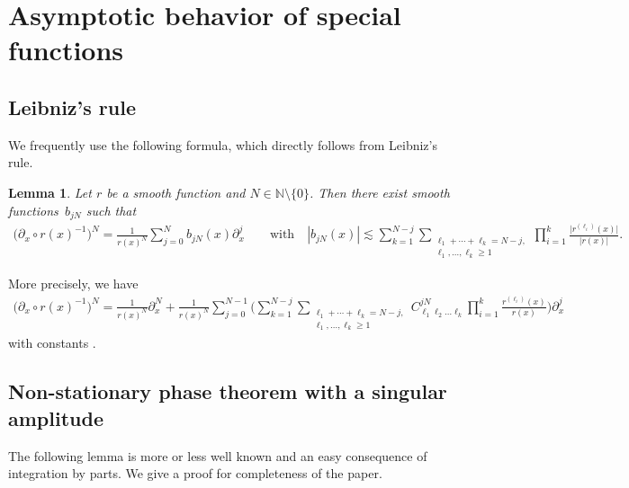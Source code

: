 \documentclass[10pt,a4paper]{amsart}
\numberwithin{equation}{section}
\newtheorem{Lemma}[Theorem]{Lemma}
\def\pa{\partial}
\begin{document}
\appendix

\section{Asymptotic behavior of special functions}

\subsection{Leibniz's rule}

We frequently use the following formula, which directly follows from Leibniz's rule.

\begin{Lemma}\label{Leibnizrule}
Let $r$ be a smooth function and $N\in\mathbb{N}\setminus\{0\}$. Then there exist smooth functions~$b_{jN}$ such that
\begin{gather*}
\bigl(\pa_x\circ r(x)^{-1}\bigr)^N=\frac{1}{r(x)^N}\!\sum_{j=0}^Nb_{jN}(x)\pa_{x}^j\qquad \text{with}\quad |b_{jN}(x)|\lesssim \sum_{k=1}^{N-j}\sum_{\substack{\ell_1+\cdots+\ell_k=N-j,\\ \ell_1,\hdots,\ell_k\geq 1}}\prod_{i=1}^k\!\frac{\big|r^{(\ell_i)}(x)\big|}{|r(x)|}.
\end{gather*}
\end{Lemma}

\begin{Remark}
More precisely, we have
\begin{align*}
\bigl(\pa_x\circ r(x)^{-1}\bigr)^N=\frac{1}{r(x)^N}\pa_x^N+\frac{1}{r(x)^N}\sum_{j=0}^{N-1}\Bigg(\sum_{k=1}^{N-j}\sum_{\substack{\ell_1+\cdots+\ell_k=N-j,\\ \ell_1,\hdots,\ell_k\geq 1}}C_{\ell_1\ell_2\hdots \ell_k}^{jN}\prod_{i=1}^{k}\frac{r^{(\ell_i)}(x)}{r(x)} \Bigg)\pa_{x}^j
\end{align*}
with constants .
\end{Remark}

\subsection{Non-stationary phase theorem with a singular amplitude}

The following lemma is more or less well known and an easy consequence of integration by parts. We give a proof for completeness of the paper.
\end{document}
